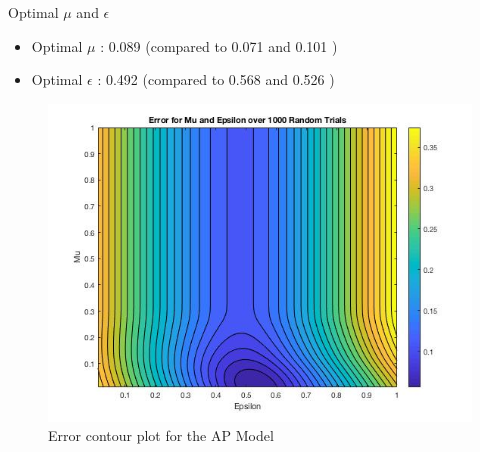 \begin{frame}{Optimal $\mu$ and $\epsilon$}
   \begin{itemize}
       \item Optimal $\mu$ : 0.089 (compared to 0.071 \cite{nima1} and 0.101 \cite{nima2})
       \item Optimal $\epsilon$ : 0.492 (compared to 0.568 \cite{nima1} and 0.526 \cite{nima2})
   \end{itemize}
 
\begin{figure}
    \centering
    \includegraphics[scale = 0.33]{figures/contour1000AP(UPDATED).jpg}
    \caption{Error contour plot for the AP Model}
    \label{fig:AP_contour}
\end{figure} 
    
\end{frame}

